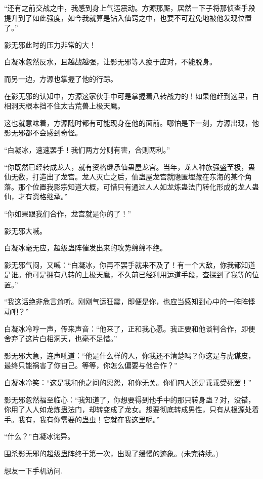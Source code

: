 \begin{this_body}
“还有之前交战之中，我感到身上气运震动。方源那厮，居然一下子将那侦查手段提升到了如此强度，如今我就算是钻入仙窍之中，也要不可避免地被他发现位置了。”

影无邪此时的压力非常的大！

白凝冰忽然反水，且越战越强，让影无邪等人疲于应对，不能脱身。

而另一边，方源也掌握了他的行踪。

在影无邪的认知中，方源这家伙手中可是掌握着八转战力的！如果他赶到这里，白相洞天根本挡不住太古荒兽上极天鹰。

这也就意味着，方源随时都有可能现身在他的面前。哪怕是下一刻，方源出现，他影无邪都不会感到奇怪。

“白凝冰，速速罢手！我们两方分则有害，合则两利。”

“你既然已经转成龙人，就有资格继承仙蛊屋龙宫。当年，龙人种族强盛至极，蛊仙无数，打造出了龙宫。龙人灭亡之后，仙蛊屋龙宫就隐匿埋藏在东海的某个角落。那个位置我影宗知道大概，可惜只有通过人人如龙炼蛊法门转化形成的龙人蛊仙，才有资格继承。”

“你如果跟我们合作，龙宫就是你的了！”

影无邪大喊。

白凝冰毫无应，超级蛊阵催发出来的攻势绵绵不绝。

影无邪气闷，又喊：“白凝冰，你再不罢手就来不及了！有一个大敌，你我都知道是谁。他可是拥有八转的上极天鹰，不久前已经利用运道手段，查探到了我等的位置。”

“我这话绝非危言耸听。刚刚气运狂震，即便是你，也应当感知到心中的一阵阵悸动吧？”

白凝冰冷哼一声，传来声音：“他来了，正和我心愿。我正要和他谈判合作，即便舍弃了这片白相洞天，也毫不足惜。”

影无邪大急，连声吼道：“他是什么样的人，你我还不清楚吗？你这是与虎谋皮，最终只能祸害了你自己。等等，你怎么偏要与他合作？”

白凝冰冷笑：“这是我和他之间的恩怨，和你无关。你们四人还是乖乖受死罢！”

影无邪忽然福至临心：“我知道了，你想要得到他手中的那只转身蛊？对，没错，你用了人人如龙炼蛊法门，却转变成了龙女。想要彻底转成男性，只有从根源处着手。我有，我有你需要的蛊虫！它就在我这里呢。”

“什么？”白凝冰诧异。

围杀影无邪的超级蛊阵终于第一次，出现了缓慢的迹象。(未完待续。)

想友一下手机访问.

\end{this_body}

